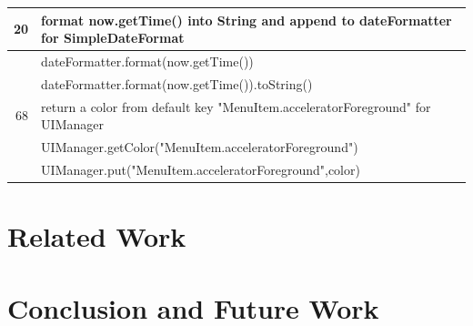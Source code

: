 \documentclass[sigconf,review,anonymous]{article}
\begin{document}
\begin{table}[]
\begin{tabular}{|l|l|}
\multicolumn{1}{|r|}{20}          & format now.getTime() into String and append to dateFormatter for SimpleDateFormat           \\ \hline
\rowcolor[HTML]{FFCCC9} 
                                  & dateFormatter.format(now.getTime())                                                         \\ \hline
\rowcolor[HTML]{FFCCC9} 
                                  & dateFormatter.format(now.getTime()).toString()                                              \\ \hline
\multicolumn{1}{|r|}{68}          & return a color from default key "MenuItem.acceleratorForeground" for UIManager              \\ \hline
\rowcolor[HTML]{FFCCC9} 
                                  & UIManager.getColor("MenuItem.acceleratorForeground")                                        \\ \hline
\rowcolor[HTML]{FFCCC9} 
                                  & UIManager.put("MenuItem.acceleratorForeground",color)                                       \\ \hline
\end{tabular}
\end{table}

\section{Related Work}
\section{Conclusion and Future Work}


{}

\end{document}
